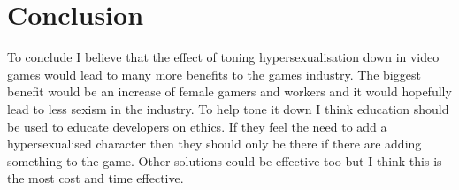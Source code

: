 \documentclass{scrartcl}
\begin{document}
\section{Conclusion}
To conclude I believe that the effect of toning hypersexualisation down in video games would lead to many more benefits to the games industry. The biggest benefit would be an increase of female gamers and workers and it would hopefully lead to less sexism in the industry. To help tone it down I think education should be used to educate developers on ethics. If they feel the need to add a hypersexualised character then they should only be there if there are adding something to the game. Other solutions could be effective too but I think this is the most cost and time effective.



\end{document}
